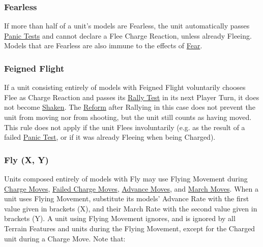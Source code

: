 \subsubsection{Fearless}
\idx[main=y]{\fearless}\label{fearless}

If more than half of a unit's models are Fearless, the unit automatically passes \hyperref[panic_test]{Panic Tests} and cannot declare a Flee Charge Reaction, unless already Fleeing. Models that are Fearless are also immune to the effects of \hyperref[fear]{Fear}.

\subsubsection{Feigned Flight}
\idx[main=y]{\feignedflight}\label{feigned_flight}

If a unit consisting entirely of models with Feigned Flight voluntarily chooses Flee as Charge Reaction and passes its \hyperref[rally_fleeing_units]{Rally Test} in its next Player Turn, it does not become \hyperref[shaken]{Shaken}. The \hyperref[reform]{Reform} after Rallying in this case does not prevent the unit from moving nor from shooting, but the unit still counts as having moved. This rule does not apply if the unit Flees involuntarily (e.g. as the result of a failed \hyperref[panic_test]{Panic Test}, or if it was already Fleeing when being Charged).

\subsubsection{Fly (X, Y)}
\idx[main=y]{\fly{}{}}\label{fly}

Units composed entirely of models with Fly may use Flying Movement during \hyperref[charge_move]{Charge Moves}, \hyperref[failed_charge]{Failed Charge Moves}, \hyperref[advance_move]{Advance Moves}, and \hyperref[march_move]{March Moves}. When a unit uses Flying Movement, substitute its models' Advance Rate with the first value given in brackets (X), and their March Rate with the second value given in brackets (Y). A unit using Flying Movement ignores, and is ignored by all Terrain Features and units during the Flying Movement, except for the Charged unit during a Charge Move. Note that:

